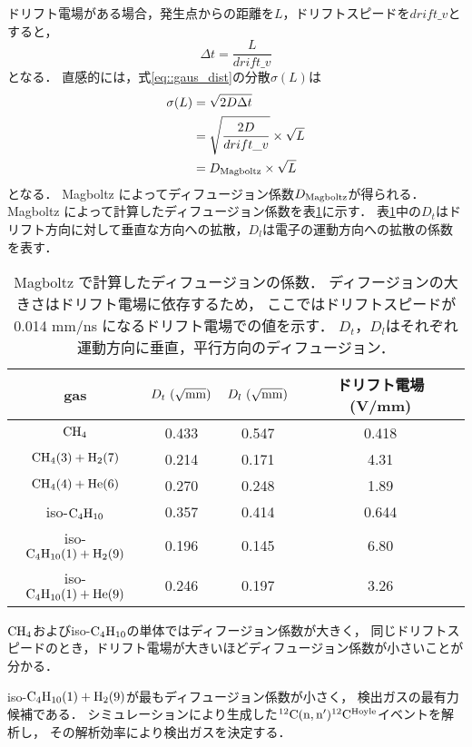 \documentclass[../master]{subfiles}
\begin{document}
ドリフト電場がある場合，発生点からの距離を$L$，ドリフトスピードを$drift\_v$とすると，
\begin{equation}
  \Delta t = \frac{L}{drift\_v}
  \label{eq::delta_t}
\end{equation}
となる．
直感的には，式\ref{eq::gaus_dist}の分散$\sigma(L)$は
\begin{align}
  \sigma(L) & = \sqrt{2 D \Delta t}\\
  & = \sqrt{\frac{2 D}{drift\_v}}\times\sqrt{L}\\
  & = D_{\rm Magboltz}\times\sqrt{L}
\end{align}
となる．
Magboltz によってディフュージョン係数$D_{\rm Magboltz}$が得られる．
Magboltz によって計算したディフュージョン係数を表\ref{tab::diffusion}に示す．
表\ref{tab::diffusion}中の$D_{t}$はドリフト方向に対して垂直な方向への拡散，$D_{l}$は電子の運動方向への拡散の係数を表す．
\begin{table}
  \centering
  \caption[Magboltz で計算したディフュージョンの係数．]
          {Magboltz で計算したディフュージョンの係数．
            ディフージョンの大きさはドリフト電場に依存するため，
            ここではドリフトスピードが0.014 mm/ns になるドリフト電場での値を示す．
          $D_{t}$，$D_{l}$はそれぞれ運動方向に垂直，平行方向のディフュージョン．}
  \label{tab::diffusion}
  \begin{tabular}{cccc}
    \toprule
    gas & $D_{t}~(\sqrt{\rm mm})$ & $D_{l}~(\sqrt{\rm mm})$ & ドリフト電場 (V/mm) \\
    \midrule
    ${\rm CH_{4}}$ & 0.433 & 0.547 & 0.418\\
    ${\rm CH_{4} (3) + H_{2} (7)}$ & 0.214 & 0.171 & 4.31\\
    ${\rm CH_{4} (4) + He (6)}$ & 0.270  & 0.248 & 1.89\\
    iso-${\rm C_{4}H_{10}}$ & 0.357 & 0.414 & 0.644\\
    iso-${\rm C_{4}H_{10} (1) + H_{2}} (9)$ & 0.196 & 0.145 & 6.80\\
    iso-${\rm C_{4}H_{10} (1) + He} (9) $ & 0.246 & 0.197 & 3.26\\
    \bottomrule
  \end{tabular}
\end{table}
${\rm CH_{4}}$およびiso-${\rm C_{4}H_{10}}$の単体ではディフージョン係数が大きく，
同じドリフトスピードのとき，ドリフト電場が大きいほどディフュージョン係数が小さいことが分かる．

iso-${\rm C_{4}H_{10} (1) + H_{2}} (9)$が最もディフュージョン係数が小さく，
検出ガスの最有力候補である．
シミュレーションにより生成した${}^{12}{\rm C}({\rm n},{\rm n}'){}^{12}{\rm C}^{\rm Hoyle}$イベントを解析し，
その解析効率により検出ガスを決定する．
\end{document}
